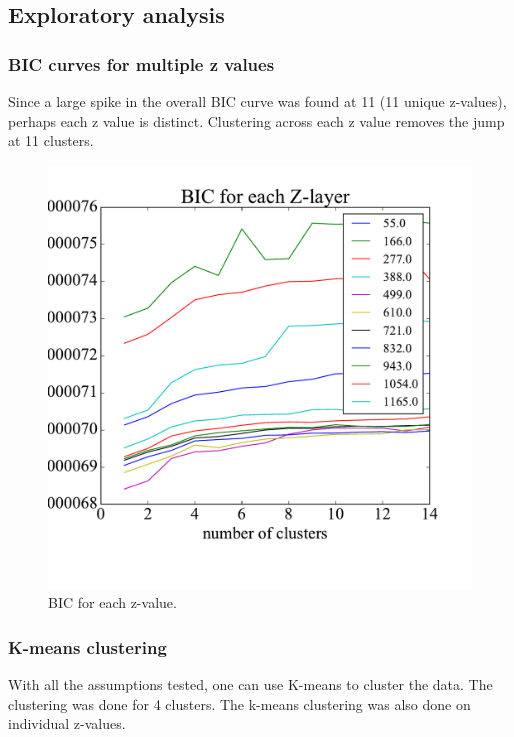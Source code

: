 \documentclass{article}
\begin{document}
\subsection{Exploratory analysis}

\subsubsection{BIC curves for multiple z values}

Since a large spike in the overall BIC curve was found at 11 (11 unique z-values), perhaps each z value is distinct. Clustering across each z value removes the jump at 11 clusters.

\begin{figure}[h]
  \centering
  \includegraphics[scale=.3]{Fig12}
  \caption{BIC for each z-value.}
\end{figure}

\subsubsection{K-means clustering}

With all the assumptions tested, one can use K-means to cluster the data. The clustering was done for 4 clusters. The k-means clustering was also done on individual z-values.
\end{document}

